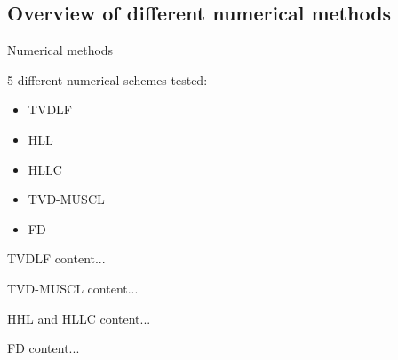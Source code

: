 \subsection{Overview of different numerical methods}
\begin{frame}{Numerical methods}

5 different numerical schemes tested:
\begin{itemize}
  	\item TVDLF
  	\item  HLL
  	\item HLLC
  	\item TVD-MUSCL 
  	\item FD
\end{itemize}

\end{frame}


\begin{frame}{TVDLF}
content...
\end{frame}

\begin{frame}{TVD-MUSCL}
content...
\end{frame}

\begin{frame}{HHL and HLLC}
content...
\end{frame}

\begin{frame}{FD}
content...
\end{frame}
